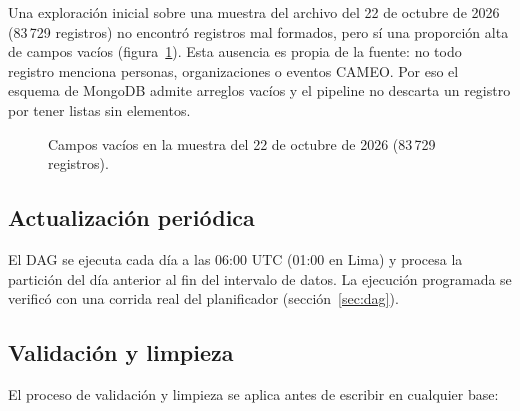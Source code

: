 \documentclass[11pt,a4paper]{article}
\newcommand{\code}[1]{\detokenize{#1}}
\begin{document}
Una exploración inicial sobre una muestra del archivo del 22 de octubre de 2026 (83\,729 registros) no encontró registros mal formados, pero sí una proporción alta de campos vacíos (figura~\ref{fig:vacios}). Esta ausencia es propia de la fuente: no todo registro menciona personas, organizaciones o eventos CAMEO. Por eso el esquema de MongoDB admite arreglos vacíos y el pipeline no descarta un registro por tener listas sin elementos.

\begin{figure}[H]
\centering
{}
\caption{Campos vacíos en la muestra del 22 de octubre de 2026 (83\,729 registros).}
\label{fig:vacios}
\end{figure}

\subsection{Actualización periódica}

El DAG se ejecuta cada día a las 06:00 UTC (01:00 en Lima) y procesa la partición del día anterior al fin del intervalo de datos. La ejecución programada se verificó con una corrida real del planificador (sección~\ref{sec:dag}).

\subsection{Validación y limpieza}

El proceso de validación y limpieza se aplica antes de escribir en cualquier base:
\end{document}
